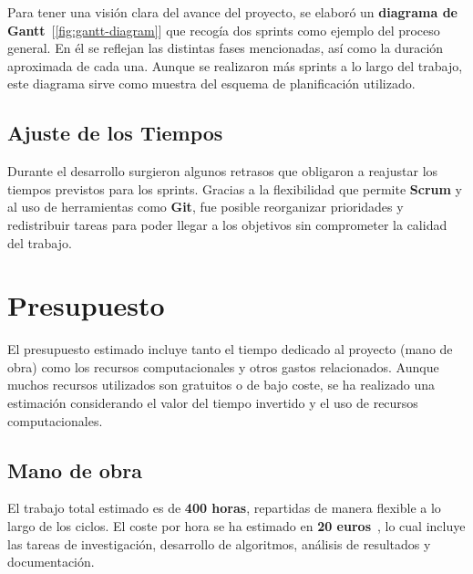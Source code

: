 Para tener una visión clara del avance del proyecto, se elaboró un \textbf{diagrama de Gantt}~[\ref{fig:gantt-diagram}]
que recogía dos sprints como ejemplo del proceso general.
En él se reflejan las distintas fases mencionadas, así como la duración aproximada de cada una.
Aunque se realizaron más sprints a lo largo del trabajo, este diagrama sirve como muestra del esquema de planificación
utilizado.

\subsection{Ajuste de los Tiempos}\label{subsec:ajuste-de-los-tiempos}
Durante el desarrollo surgieron algunos retrasos que obligaron a reajustar los tiempos previstos para los sprints.
Gracias a la flexibilidad que permite \textbf{Scrum} y al uso de herramientas como \textbf{Git}, fue posible
reorganizar prioridades y redistribuir tareas para poder llegar a los objetivos sin comprometer la calidad del trabajo.

\section{Presupuesto}\label{sec:presupuesto}
El presupuesto estimado incluye tanto el tiempo dedicado al proyecto (mano de obra) como los recursos computacionales y
otros gastos relacionados.
Aunque muchos recursos utilizados son gratuitos o de bajo coste, se ha realizado una estimación considerando el valor
del tiempo invertido y el uso de recursos computacionales.

\subsection{Mano de obra}\label{subsec:mano-de-obra}
El trabajo total estimado es de \textbf{400 horas}, repartidas de manera flexible a lo largo de los ciclos.
El coste por hora se ha estimado en \textbf{20 euros}~\cite{SalarioParaData}, lo cual incluye las tareas de
investigación, desarrollo de algoritmos, análisis de resultados y documentación.

